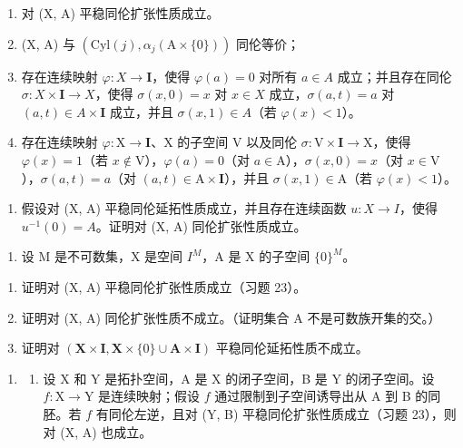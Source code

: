 \begin{enumerate}
\def\labelenumi{(\roman{enumi})}
\item
  对 (X, A) 平稳同伦扩张性质成立。
\item
  (X, A) 与 \((\mathrm{Cyl}(j), \alpha_{j}(\mathrm{A} \times \{0\}))\) 同伦等价；
\item
  存在连续映射 \(\varphi\colon X\to\mathbf{I}\)，使得 \(\varphi(a)=0\) 对所有 \(a\in A\) 成立；并且存在同伦 \(\sigma\colon X\times\mathbf{I}\to X\)，使得 \(\sigma(x,0)=x\) 对 \(x\in X\) 成立，\(\sigma(a,t)=a\) 对 \((a,t)\in A\times\mathbf{I}\) 成立，并且 \(\sigma(x,1)\in A\)（若 \(\varphi(x)<1\)）。
\item
  存在连续映射 \(\varphi\colon\mathrm{X}\to\mathbf{I}\)、X 的子空间 V 以及同伦 \(\sigma\colon\mathrm{V}\times\mathbf{I}\to\mathrm{X}\)，使得 \(\varphi(x)=1\)（若 \(x\notin\mathrm{V}\)），\(\varphi(a)=0\)（对 \(a\in\mathrm{A}\)），\(\sigma(x,0)=x\)（对 \(x\in\mathrm{V}\)），\(\sigma(a,t)=a\)（对 \((a,t)\in\mathrm{A}\times\mathbf{I}\)），并且 \(\sigma(x,1)\in\mathrm{A}\)（若 \(\varphi(x)<1\)）。
\end{enumerate}

\begin{enumerate}
\def\labelenumi{\alph{enumi})}
\setcounter{enumi}{1}
\tightlist
\item
  假设对 (X, A) 平稳同伦延拓性质成立，并且存在连续函数 \(u \colon X \to I\)，使得 \(u^{-1}(0) = A\)。证明对 (X, A) 同伦扩张性质成立。
\end{enumerate}

\begin{enumerate}
\def\labelenumi{\arabic{enumi})}
\setcounter{enumi}{23}
\tightlist
\item
  设 M 是不可数集，X 是空间 \(I^{M}\)，A 是 X 的子空间 \(\{0\}^{M}\)。
\end{enumerate}

\begin{enumerate}
\def\labelenumi{\alph{enumi})}
\item
  证明对 (X, A) 平稳同伦扩张性质成立（习题 23）。
\item
  证明对 (X, A) 同伦扩张性质不成立。（证明集合 A 不是可数族开集的交。）
\item
  证明对 \((\mathbf{X} \times \mathbf{I}, \mathbf{X} \times \{0\} \cup \mathbf{A} \times \mathbf{I})\) 平稳同伦延拓性质不成立。
\end{enumerate}

\begin{enumerate}
\def\labelenumi{\arabic{enumi})}
\setcounter{enumi}{24}
\tightlist
\item
  \begin{enumerate}
  \def\labelenumii{\alph{enumii})}
  \tightlist
  \item
  设 X 和 Y 是拓扑空间，A 是 X 的闭子空间，B 是 Y 的闭子空间。设 \(f \colon \mathrm{X} \to \mathrm{Y}\) 是连续映射；假设 \(f\) 通过限制到子空间诱导出从 A 到 B 的同胚。若 \(f\) 有同伦左逆，且对 (Y, B) 平稳同伦扩张性质成立（习题 23），则对 (X, A) 也成立。
  \end{enumerate}
\end{enumerate}

